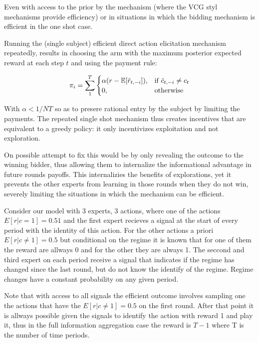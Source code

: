 Even with access to the prior by the mechanism (where the VCG styl mechanisms provide efficiency) or in situations in which the bidding mechanism is efficient in the one shot case.

Running the (single subject) efficient direct action elicitation mechanism repeatedly, results in choosing the arm with the maximum posterior expected reward at each step $t$ and using the payment rule:

\[
    \pi_i = \sum_1^T 
\begin{cases}
    \alpha (r - \expec[\hat{r}_{t,-i}]) ,& \text{if } \hat{c}_{t,-i} \neq c_t\\
    0,              & \text{otherwise}
\end{cases}
\]

With $\alpha < 1/NT$ so as to presere rational entry by the subject by limiting the payments.
The repeated single shot mechanism thus creates incentives that are equivalent to a greedy policy: it only incentivizes exploitation and not exploration.

On possible attempt to fix this would be by only revealing the outcome to the winning bidder, thus allowing them to internalize the informational advantage in future rounds payoffs. 
This  internalizies the benefits of explorations, yet it prevents the other experts from learning in those rounds when they do not win, severely limiting the situations in which the mechanism can be efficient. 

\begin{eg}\label{eg:2regimes}
	Consider our model with 3 experts, 3 actions, where one of the actions $E[r|c=1]=0.51$ and the first expert recieves a signal at the start of every period with the identity of this action. For the other actions a priori $E[r|c\neq1]=0.5$ but conditional on the regime it is known that for one of them the reward are allways 0 and for the other they are always 1. The seccond and third expert on each period receive a signal that indicates if the regime has changed since the last round, but do not know the identify of the regime. Regime changes have a constant probability on any given period.
\end{eg}

Note that with access to all signals the efficient outcome involves sampling one the actions that have the $E[r|c\neq1]=0.5$ on the first round. After that point it is allways possible given the signals to identify the action with reward 1 and play it, thus in the full information aggregation case the reward is $T-1$ where T is the number of time periods. 


